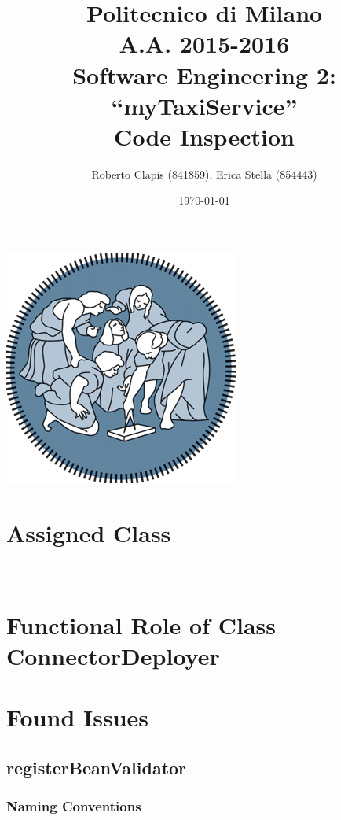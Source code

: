 \documentclass{article}
\author{Roberto Clapis (841859), Erica Stella (854443)}
\date{\today}
\title{Politecnico di Milano
	\\A.A. 2015\@-\@2016
	\\Software Engineering 2: ``myTaxiService''
	\\\textbf{C}ode \textbf{I}nspection}
\begin{document}
	\maketitle
	\begin{center}
		\includegraphics{polimi-logo}
	\end{center}
	\clearpage
	\tableofcontents
	\clearpage
	
\section{Assigned Class}
  	
\section{Functional Role of Class ConnectorDeployer}

\section{Found Issues}

\subsection{registerBeanValidator}

\subsubsection{Naming Conventions}
\end{document}
